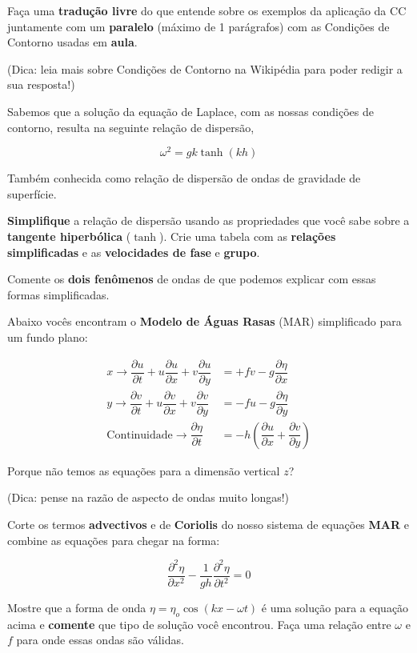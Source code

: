 \documentclass[letterpaper,portuguese,12pt,pdftex]{exam}
\newcommand{\pd}[2]{\dfrac{\partial #1}{\partial #2}}
\begin{document}
\begin{questions}
Faça uma {\bf tradução livre} do que entende sobre os exemplos da aplicação da
CC juntamente com um {\bf paralelo} (máximo de 1 parágrafos) com as Condições de
Contorno usadas em {\bf aula}.

(Dica: leia mais sobre Condições de Contorno na Wikipédia para poder redigir a
sua resposta!)

\question[2]
Sabemos que a solução da equação de Laplace, com as nossas condições de contorno,
resulta na seguinte relação de dispersão,

\[
  \omega^2 = gk\tanh(kh)
\]

Também conhecida como relação de dispersão de ondas de gravidade de superfície.

{\bf Simplifique} a relação de dispersão usando as propriedades que você sabe
sobre a {\bf tangente hiperbólica} ($\tanh$).  Crie uma tabela com as
{\bf relações simplificadas} e as {\bf velocidades de fase} e {\bf grupo}.

Comente os {\bf dois fenômenos} de ondas de que podemos explicar com essas
formas simplificadas.

\question[1]
Abaixo vocês encontram o {\bf Modelo de Águas Rasas} (MAR) simplificado para um
fundo plano:

\begin{align}
  x\rightarrow \pd{u}{t} + u\pd{u}{x} + v\pd{u}{y} &= +fv -g\pd{\eta}{x} \label{eq:x-dir} \\
  y\rightarrow \pd{v}{t} + u\pd{v}{x} + v\pd{v}{y}&= -fu -g\pd{\eta}{y} \label{eq:y-dir} \\
  \text{Continuidade}\rightarrow\pd{\eta}{t} &= -h\left({\pd{u}{x}} + \pd{v}{y}\right) \label{eq:continuity}
\end{align}

Porque não temos as equações para a dimensão vertical $z$?

(Dica: pense na razão de aspecto de ondas muito longas!)

\question[1]
Corte os termos {\bf advectivos} e de {\bf Coriolis} do nosso sistema de equações
{\bf MAR} e combine as equações para chegar na forma:

\[
\dfrac{\partial^2\eta}{\partial x^2} - \dfrac{1}{gh}\dfrac{\partial^2\eta}{\partial{t^2}} = 0
\]

\question[1]
Mostre que a forma de onda $\eta = \eta_o \cos(kx - \omega t)$ é uma solução
para a equação acima e {\bf comente} que tipo de solução você encontrou.  Faça
uma relação entre $\omega$ e $f$ para onde essas ondas são válidas.


\end{questions}
\end{document}
